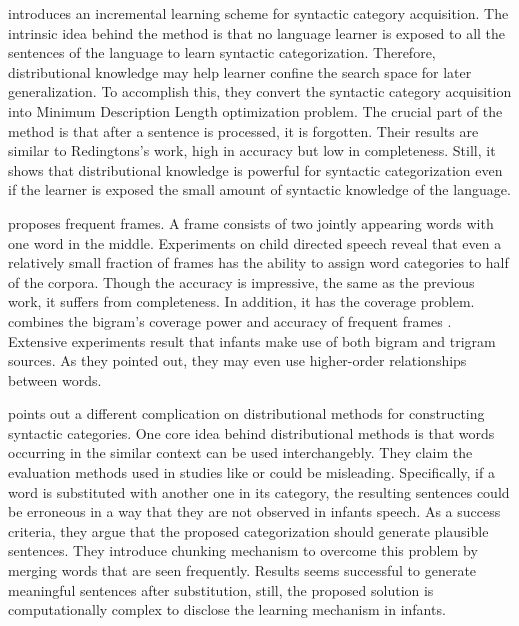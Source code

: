 \cite{cartwright1997syntactic} introduces an incremental learning
scheme for syntactic category acquisition. The intrinsic idea behind 
the method is that no language learner is exposed to all the sentences of the language to learn
syntactic categorization. Therefore, distributional knowledge
 may help learner confine the search space for later generalization.
To accomplish this, they convert the syntactic category acquisition into 
Minimum Description Length optimization problem. The crucial part of the method is that after a sentence
is processed, it is forgotten. Their results are similar to Redingtons's work, high
in accuracy but low in completeness. Still, it shows that distributional
knowledge is powerful for syntactic categorization even if the learner is
exposed the small amount of syntactic knowledge of the language.

\cite{Mintz200391} proposes frequent frames. A frame consists of 
two jointly appearing words with one word in the middle. 
Experiments on child directed speech reveal that even a relatively small
fraction of frames has the ability to assign word categories to 
half of the corpora. Though the accuracy is impressive, the same as the previous work, it suffers from
completeness. In addition, it has the coverage problem. \cite{clair2010} 
combines the bigram's coverage power \cite{Redington98distributionalinformation, monaghan2008integration}
 and accuracy of frequent frames \cite{Mintz200391}. Extensive 
experiments result that infants make use of both bigram and 
trigram sources. As they pointed out, they may even use higher-order 
relationships between words. 

\cite{freudenthal2005resolution} points out a different complication on distributional
methods for constructing syntactic categories. One core idea behind
distributional methods is that words occurring in the similar context
 can be used interchangebly. They claim the evaluation methods used in studies
like \cite{Redington98distributionalinformation, monaghan2008integration} or \cite{Mintz200391} 
could be misleading. Specifically, if a word is substituted with another one in its
category, the resulting sentences could be erroneous in a way that they are not observed in
infants speech. As a success criteria, they argue that the proposed categorization
should generate plausible sentences. They introduce chunking mechanism to
overcome this problem by merging words that are seen frequently. Results seems
successful to generate meaningful sentences after substitution, still, the
proposed solution is computationally complex to disclose the learning mechanism
in infants.


